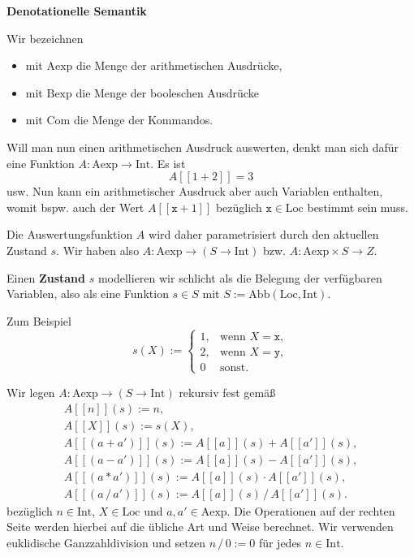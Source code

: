 \documentclass[8pt,fleqn,aspectratio=169]{beamer}
\newcommand{\strong}[1]{\textsf{\textbf{#1}}}
\newcommand{\centerheadline}[1]{%
  \begin{center}\strong{#1}\end{center}}
\newcommand{\parspace}{\vspace{0.8em}}
\newcommand{\code}[1]{{\texttt{#1}}}
\newcommand{\qb}[1]{[\!\![#1]\!\!]}
\newcommand{\Int}{\mathrm{Int}}
\newcommand{\Loc}{\mathrm{Loc}}
\newcommand{\Aexp}{\mathrm{Aexp}}
\newcommand{\Bexp}{\mathrm{Bexp}}
\newcommand{\Com}{\mathrm{Com}}
\newcommand{\Abb}{\mathrm{Abb}}
\begin{document}
\begin{frame}
\centerheadline{Denotationelle Semantik}
\end{frame}

\begin{frame}
Wir bezeichnen
\begin{itemize}
\item mit $\Aexp$ die Menge der arithmetischen Ausdrücke,
\item mit $\Bexp$ die Menge der booleschen Ausdrücke
\item mit $\Com$ die Menge der Kommandos.
\end{itemize}\pause
Will man nun einen arithmetischen Ausdruck auswerten, denkt
man sich dafür eine Funktion $A\colon\Aexp\to\Int$. Es ist
\[A\qb{1+2} = 3\]
usw. Nun kann ein arithmetischer Ausdruck aber auch Variablen enthalten,
womit bspw. auch der Wert $A\qb{\code{x}+1}$ bezüglich $\code{x}\in\Loc$
bestimmt sein muss.
\end{frame}

\begin{frame}
Die Auswertungsfunktion $A$ wird daher parametrisiert durch den aktuellen
Zustand $s$. Wir haben also $A\colon\Aexp\to (S\to\Int)$
bzw. $A\colon\Aexp\times S\to Z$.\pause

\parspace
Einen \strong{Zustand} $s$ modellieren wir schlicht als die Belegung
der verfügbaren Variablen, also als eine Funktion $s\in S$ mit
$S:=\Abb(\Loc,\Int)$.\pause

\parspace
Zum Beispiel
\[s(X) := \begin{cases}
1, & \text{wenn $X=\code{x}$},\\
2, & \text{wenn $X=\code{y}$},\\
0 & \text{sonst}. 
\end{cases}\]
\end{frame}

\begin{frame}
Wir legen $A\colon\Aexp\to (S\to\Int)$ rekursiv fest gemäß
\begin{gather*}
A\qb{n}(s) := n,\\
A\qb{X}(s) := s(X),\\
A\qb{(a+a')}(s) := A\qb{a}(s) + A\qb{a'}(s),\\
A\qb{(a-a')}(s) := A\qb{a}(s) - A\qb{a'}(s),\\
A\qb{(a*a')}(s) := A\qb{a}(s) \cdot A\qb{a'}(s),\\
A\qb{(a\,/\,a')}(s) := A\qb{a}(s)\,/\, A\qb{a'}(s).
\end{gather*}
bezüglich $n\in\Int$, $X\in\Loc$ und $a,a'\in\Aexp$.
Die Operationen auf der rechten Seite werden hierbei auf die übliche
Art und Weise berechnet. Wir verwenden euklidische Ganzzahldivision
und setzen $n\,/\,0:=0$ für jedes $n\in\Int$.
\end{frame}
\end{document}
